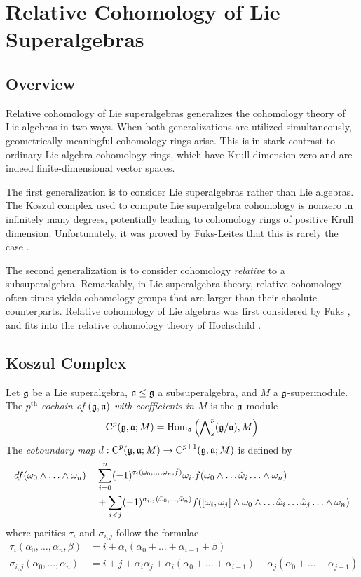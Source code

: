 \chapter{Relative Cohomology of Lie Superalgebras}
\label{chap:rel-cohom}
\section{Overview}
\label{sec:coh-overview}

Relative cohomology of Lie superalgebras generalizes the cohomology theory of Lie algebras in two ways. When both generalizations are utilized simultaneously, geometrically meaningful cohomology rings arise. This is in stark contrast to ordinary Lie algebra cohomology rings, which have Krull dimension zero and are indeed finite-dimensional vector spaces.

The first generalization is to consider Lie superalgebras rather than Lie algebras. The Koszul complex used to compute Lie superalgebra cohomology is nonzero in infinitely many degrees, potentially leading to cohomology rings of positive Krull dimension. Unfortunately, it was proved by Fuks-Leites that this is rarely the case \cite{fuks-leites}.

The second generalization is to consider cohomology \emph{relative} to a subsuperalgebra. Remarkably, in Lie superalgebra theory, relative cohomology often times yields cohomology groups that are larger than their absolute counterparts. Relative cohomology of Lie algebras was first considered by Fuks \cite{fuks}, and fits into the relative cohomology theory of Hochschild \cite{hochschild}.

\section{Koszul Complex}
\label{sec:koszul}

  Let $\mathfrak{g}$ be a Lie superalgebra, $\mathfrak{a} \leq \mathfrak{g}$ a subsuperalgebra, and $M$ a $\mathfrak{g}$-supermodule. The \emph{$p^\text{th}$ cochain of $(\mathfrak{g},\mathfrak{a})$ with coefficients in $M$} is the $\mathfrak{a}$-module
  \[
    \operatorname{C}^p(\mathfrak{g},\mathfrak{a};M) = \operatorname{Hom}_{\mathfrak{a}}\left( \bigwedge\nolimits^{p}_s(\mathfrak{g}/\mathfrak{a}), M \right)
  \]
  The \emph{coboundary map} $d: \operatorname{C}^p(\mathfrak{g},\mathfrak{a};M) \to \operatorname{C}^{p+1}(\mathfrak{g},\mathfrak{a};M)$ is defined by
\begin{align*}
  df(\omega_0 \wedge \ldots \wedge \omega_n) = &\sum_{i = 0}^n (-1)^{\tau_i(\bar {\omega}_0, \ldots,\bar{\omega}_n,\bar f)} \omega_i .f(\omega_0 \wedge \ldots \hat {\omega}_i \ldots \wedge \omega_n) \\
 &+ \sum_{i < j} (-1)^{\sigma_{i,j}(\bar {\omega}_0, \ldots , \bar {\omega}_n)} f([\omega_i,\omega_j] \wedge \omega_0 \wedge \ldots \hat {\omega}_i \ldots \hat {\omega}_j \ldots \wedge \omega_n)
\end{align*}
where parities $\tau_i$ and $\sigma_{i,j}$ follow the formulae
\begin{align*}
  \tau_i(\alpha_0,\ldots,\alpha_n,\beta) &= i + \alpha_i (\alpha_0 + \ldots + \alpha_{i-1} + \beta)\\
  \sigma_{i,j}(\alpha_0,\ldots,\alpha_n) &= i + j + \alpha_i \alpha_j + \alpha_i(\alpha_0 + \ldots + \alpha_{i-1}) + \alpha_j (\alpha_0 + \ldots + \alpha_{j-1})
\end{align*}


